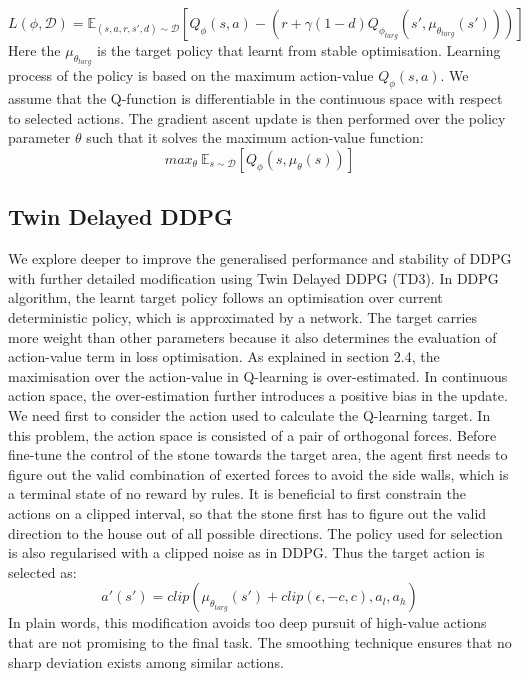 \documentclass[oneside,11pt,a4paper]{article}
\begin{document}
$$
L(\phi, \mathcal D) = \mathbb E_{(s,a,r,s',d)\sim \mathcal D}[Q_\phi(s,a) - (r+\gamma (1-d)Q_{\phi_{targ}}(s', \mu_{\theta_{targ}}(s')))]
$$
Here the $\mu_{\theta_{targ}}$ is the target policy that learnt from stable optimisation. Learning process of the policy is based on the maximum action-value $Q_\phi(s,a)$. We assume that the Q-function is differentiable in the continuous space with respect to selected actions. The gradient ascent update is then performed over the policy parameter $\theta$ such that it solves the maximum action-value function:
$$
max_\theta \  \mathbb E_{s\sim \mathcal D}[Q_\phi(s, \mu_\theta(s))]
$$
\newline
\newline
\noindent
\subsection{Twin Delayed DDPG}
We explore deeper to improve the generalised performance and stability of DDPG with further detailed modification using Twin Delayed DDPG (TD3). \cite{td3}
\newline
\newline
\noindent
In DDPG algorithm, the learnt target policy follows an optimisation over current deterministic policy, which is approximated by a network. The target carries more weight than other parameters because it also determines the evaluation of action-value term in loss optimisation. As explained in section 2.4, the maximisation over the action-value in Q-learning is over-estimated. In continuous action space, the over-estimation further introduces a positive bias in the update.
\newline
\newline
\noindent
We need first to consider the action used to calculate the Q-learning target. In this problem, the action space is consisted of a pair of orthogonal forces. Before fine-tune the control of the stone towards the target area, the agent first needs to figure out the valid combination of exerted forces to avoid the side walls, which is a terminal state of no reward by rules. It is beneficial to first constrain the actions on a clipped interval, so that the stone first has to figure out the valid direction to the house out of all possible directions. The policy used for selection is also regularised with a clipped noise as in DDPG. Thus the target action is selected as:
$$
a'(s') = clip(\mu_{\theta_{targ}}(s') + clip(\epsilon,-c,c), a_l,a_h)
$$
In plain words, this modification avoids too deep pursuit of high-value actions that are not promising to the final task. The smoothing technique ensures that no sharp deviation exists among similar actions.
\end{document}

